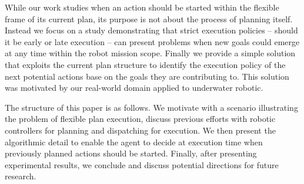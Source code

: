 While our work studies when an action should be started within the
flexible frame of its current plan, its purpose is not about the
process of planning itself. Instead we focus on a study demonstrating
that strict execution policies -- should it be early or late execution
-- can present problems when new goals could emerge at any time within
the robot mission scope. Finally we provide a simple solution that
exploits the current plan structure to identify the execution policy
of the next potential actions base on the goals they are contributing
to. This solution was motivated by our real-world domain applied to
underwater robotic.




The structure of this paper is as follows. We motivate with a
scenario illustrating the problem of flexible plan execution, discuss
previous efforts with robotic controllers for planning and dispatching
for execution. We then present the algorithmic detail to enable the
agent to decide at execution time when previously planned actions 
should be started. Finally, after presenting experimental results, 
we conclude and discuss potential directions for future research.

